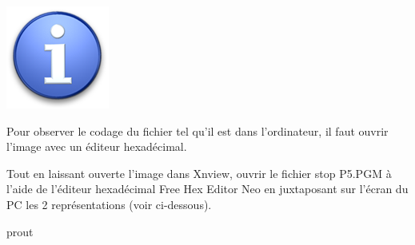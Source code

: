 \documentclass{article}
\begin{document}
\begin{minipage}[b]{.08\linewidth}
	\includegraphics[width=\linewidth]{./figures/info.png}
\end{minipage}
\hfill
\begin{minipage}[b]{.85\linewidth}
	Pour observer le codage du fichier tel qu’il est dans l’ordinateur, il faut ouvrir l’image avec	un éditeur hexadécimal.
	\vspace{.7em}
\end{minipage}
Tout en laissant ouverte l'image dans Xnview, ouvrir le fichier \og{}stop P5.PGM\fg{}
à l'aide de l’éditeur hexadécimal \og{}Free Hex Editor Neo\fg{} en juxtaposant sur l'écran du PC les 2 représentations (voir ci-dessous).

\newpage
prout
\end{document}
